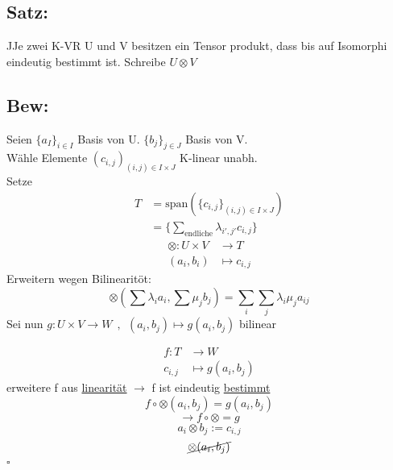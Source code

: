 \documentclass[titlepage,12pt,a4paper,ngerman]{report}
\newenvironment{bew}[1]{\subsection{Bew: #1}}{\hfill$\square$}
\newcommand{\Bew}[2]{\begin{bew}{#1}#2\end{bew}}
\newcommand{\tx}[1]{\textrm{#1}}
\newcommand{\spa}{\tx{span}}
\begin{document}
\subsection{Satz:}
JJe zwei K-VR U und V besitzen ein Tensor produkt, dass bis auf Isomorphi eindeutig bestimmt ist. Schreibe $ U \otimes V $
\Bew{}{
Seien $ \{a_I\}_{i \in I} $ Basis von U. $ \{b_j\}_{j\in J} $ Basis von V.\\
Wähle Elemente $ (c_{i,j})_{(i,j) \in I \times J} $ K-linear unabh.\\[5pt]
Setze 
\begin{align*}
T &= \spa(\{c_{i,j}\}_{(i,j) \in I \times J})\\
&= \bigg\{ \sum_{\tx{endliche}} \lambda_{i',j'} c_{i,j} \bigg\}
\end{align*}
\begin{align*}
\otimes : U \times V &\to T\\
(a_i,b_i) &\mapsto c_{i,j}
\end{align*}
Erweitern wegen Bilinearitöt:
$$\otimes (\sum \lambda_i a_i, \sum \mu_j b_j) = \sum_i \sum_j \lambda_i \mu_j a_{ij}$$
Sei nun $ g: U \times V \to W \ \ , \ \ (a_i,b_j) \mapsto g(a_i,b_j) $ bilinear

\begin{align*}
f: T & \to W\\c_{i,j} &\mapsto g(a_i,b_j)
\end{align*}
erweitere f aus \underline{linearität} $ \rightarrow $ f ist eindeutig \underline{bestimmt}
$$f \circ \otimes (a_i,b_j) = g(a_i,b_j)$$
$$ \rightarrow f \circ \otimes = g$$
$$ a_i \otimes b_j := c_{i,j}$$
$$\cancel{\otimes (a_i,b_j)} $$
}




	 
\end{document}
